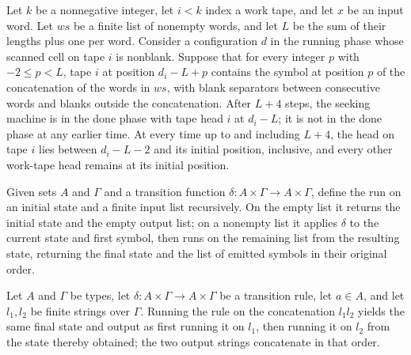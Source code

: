 \begin{theorem}
\label{Turing.seekStartTM_run_ofCfg}
\leanok
{}
Let $k$ be a nonnegative integer, let $i<k$ index a work tape, and let $x$ be an input
word. Let $ws$ be a finite list of nonempty words, and let $L$ be the sum of their
lengths plus one per word. Consider a configuration $d$ in the running phase whose
scanned cell on tape $i$ is nonblank. Suppose that for every integer $p$ with $-2\le
p<L$, tape $i$ at position $d_i-L+p$ contains the symbol at position $p$ of the
concatenation of the words in $ws$, with blank separators between consecutive words and
blanks outside the concatenation. After $L+4$ steps, the seeking machine is in the done
phase with tape head $i$ at $d_i-L$; it is not in the done phase at any earlier time. At
every time up to and including $L+4$, the head on tape $i$ lies between $d_i-L-2$ and
its initial position, inclusive, and every other work-tape head remains at its initial
position.
\end{theorem}

\begin{definition}
\label{Turing.mealyRun}
\leanok
Given sets $A$ and $\Gamma$ and a transition function $\delta:A\times\Gamma\to
A\times\Gamma$, define the run on an initial state and a finite input list recursively.
On the empty list it returns the initial state and the empty output list; on a nonempty
list it applies $\delta$ to the current state and first symbol, then runs on the
remaining list from the resulting state, returning the final state and the list of
emitted symbols in their original order.
\end{definition}

\begin{theorem}
\label{Turing.mealyRun_append}
\leanok
{}
Let $A$ and $\Gamma$ be types, let $\delta:A\times\Gamma\to A\times\Gamma$ be a
transition rule, let $a\in A$, and let $l_1,l_2$ be finite strings over $\Gamma$.
Running the rule on the concatenation $l_1l_2$ yields the same final state and output as
first running it on $l_1$, then running it on $l_2$ from the state thereby obtained; the
two output strings concatenate in that order.
\end{theorem}

